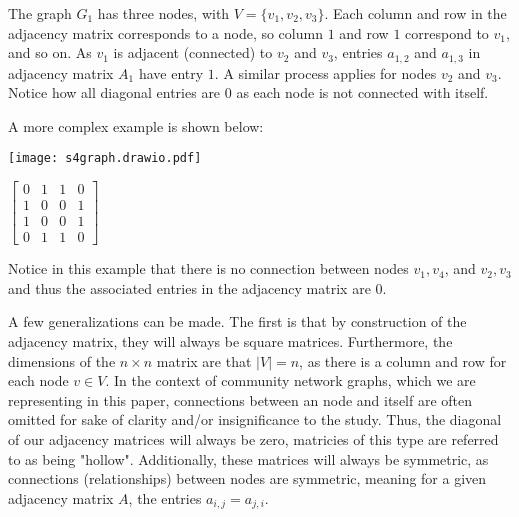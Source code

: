 \documentclass{article}
\begin{document}
The graph $G_1$ has three nodes, with $V = \{ v_1, v_2, v_3\}$.
Each column and row in the adjacency matrix corresponds to a node, so column $1$ and row $1$ correspond to $v_1$, and so on.
As $v_1$ is adjacent (connected) to $v_2$ and $v_3$, entries $a_{1,2}$ and $a_{1,3}$ in adjacency matrix $A_1$ have entry $1$. 
A similar process applies for nodes $v_2$ and $v_3$. 
Notice how all diagonal entries are $0$ as each node is not connected with itself.

\bigskip 
\noindent A more complex example is shown below:

\bigskip

\noindent\begin{minipage}{.5\textwidth}
\centering
\texttt{[image: s4graph.drawio.pdf]}
\label{fig:fig7}            
\end{minipage}%
\begin{minipage}{.5\textwidth}
\centering
\vspace{1cm}
 $\begin{bmatrix}
0 & 1 & 1 & 0\\
1 & 0 & 0 & 1\\
1 & 0 & 0 & 1\\
0 & 1 & 1 & 0
\end{bmatrix}$
\vspace{0.88cm}

\label{fig:fig8}            
\end{minipage}

\bigskip

\noindent Notice in this example that there is no connection between nodes $v_1, v_4$, and $v_2, v_3$ and thus the associated entries in the adjacency matrix are $0$.

\bigskip 
A few generalizations can be made. The first is that by construction of the adjacency matrix, they will always be square matrices.
Furthermore, the dimensions of the $n \times n$ matrix are that $|V| = n$, as there is a column and row for each node $v \in V$.
In the context of community network graphs, which we are representing in this paper, connections between an node and itself are often omitted for sake of clarity and/or insignificance to the study.
Thus, the diagonal of our adjacency matrices will always be zero, matricies of this type are referred to as being "hollow". 
Additionally, these matrices will always be symmetric, as connections (relationships) between nodes are symmetric, meaning for a given adjacency matrix $A$, the entries $a_{i,j} = a_{j,i}$.
\end{document}
